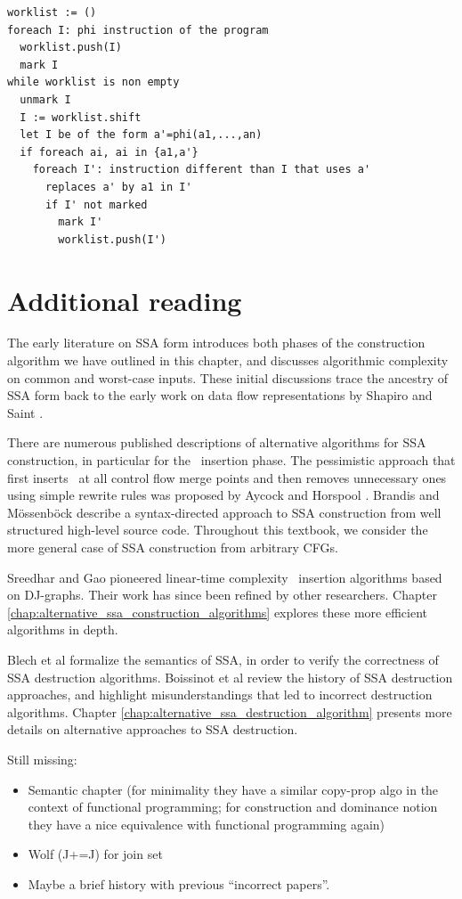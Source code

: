 \begin{verbatim}
worklist := ()
foreach I: phi instruction of the program
  worklist.push(I)
  mark I
while worklist is non empty
  unmark I
  I := worklist.shift
  let I be of the form a'=phi(a1,...,an)
  if foreach ai, ai in {a1,a'}
    foreach I': instruction different than I that uses a'
      replaces a' by a1 in I'
      if I' not marked
        mark I'
        worklist.push(I')
\end{verbatim}


\section{Additional reading}

The early literature on SSA form
\cite{cytron89efficient,cytron91efficiently}
introduces both phases of the construction algorithm
we have outlined in this chapter,
and discusses algorithmic complexity on common and worst-case inputs.
These initial discussions trace the ancestry of SSA form back to the
early work on data flow representations by Shapiro and Saint
\cite{shapiro69representation}.

There are numerous published descriptions of alternative algorithms
for SSA construction, in particular for the \phiop\ insertion phase.
The pessimistic approach that first inserts \phiops\ at all control flow merge points and then removes unnecessary ones using simple rewrite rules was proposed by Aycock
and Horspool \cite{aycock00simple}. 
Brandis and M\"{o}ssenb\"{o}ck 
\cite{brandis94single}
describe a 
syntax-directed approach to SSA construction from 
well structured high-level source code.
Throughout this textbook, we consider the more
general case of SSA construction from arbitrary CFGs.

Sreedhar and Gao \cite{sreedhar95linear} pioneered
linear-time complexity 
\phiop\ insertion
algorithms based on DJ-graphs.
Their work has since been refined by other researchers.
Chapter \ref{chap:alternative_ssa_construction_algorithms}
explores these more efficient algorithms in depth.

Blech et al \cite{blech05optimizing}
formalize the semantics of SSA, in order to verify
the correctness of SSA destruction algorithms.
Boissinot et al \cite{boissinot09revisiting} review the history of SSA destruction approaches,
and highlight misunderstandings that led to incorrect destruction
algorithms.
Chapter \ref{chap:alternative_ssa_destruction_algorithm} presents
more details on alternative approaches to SSA destruction.

Still missing:
\begin{itemize}
\item Semantic chapter (for minimality they have a similar copy-prop algo in the context of functional programming; for construction and dominance notion they have a nice equivalence with functional programming again) 
\item Wolf (J+=J) for join set
\item Maybe a brief history with previous ``incorrect papers''.
\end{itemize}
